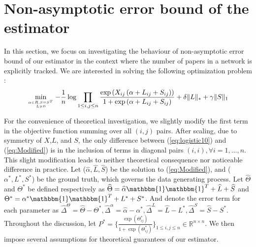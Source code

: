 \documentclass[AMS,STIX1COL]{WileyNJD-v2}
\begin{document}
{\section{Non-asymptotic error bound of the estimator}
\label{sec:theorem}
In this section, we focus on investigating the behaviour of non-asymptotic error bound of our estimator in the context where the number of papers in a network is explicitly tracked. We are interested in solving the following optimization problem :
\begin{equation}\label{eq:Modified}
\min\limits_{\alpha \in R, S = S^T \atop L \succcurlyeq 0}
-\frac{1}{n} \log \prod_{1\le i,j\le n}\frac{\exp\left(X_{ij}\left(\alpha+
L_{ij}+S_{ij}\right)\right)}{1+\exp\left(\alpha+
L_{ij}+S_{ij}\right)} + \delta \|L\|_\ast + \gamma \|S\|_1
\end{equation}

For the convenience of theoretical investigation, we slightly modify the first term in the objective function summing over all $(i,j)$ pairs.
After scaling, due to symmetry of $X$,$L$, and $S$, the only difference between (\ref{eq:logistic10}) and (\ref{eq:Modified}) is in the inclusion of terms in diagonal pairs $(i,i),\forall i=1,\dots,n$.
This slight modification leads to neither theoretical consequence nor noticeable difference in practice.
Let ($\widehat{\alpha},\widehat{L},\widehat{S}$) be the solution to (\ref{eq:Modified}), and ($\alpha^{*},L^{*},S^{*}$) be the ground truth, which governs the data generating process.
Let $\widehat{\Theta}$ and $\Theta^{*}$ be defined respectively as $\widehat{\Theta} = \widehat{\alpha}\mathbbm{1}\mathbbm{1}^T+\widehat{L}+\widehat{S}$ and $\Theta^{*} = \alpha^{*}\mathbbm{1}\mathbbm{1}^T+L^{*}+S^{*}$.
And denote the error term for each parameter as $\widehat{\Delta}^{\Theta} = \widehat{\Theta}-\Theta^{*},
\widehat{\Delta}^{\alpha} = \widehat{\alpha}-\alpha^{*},
\widehat{\Delta}^L = \widehat{L}-L^{*},
\widehat{\Delta}^S = \widehat{S}-S^{*}.$
Throughout the discussion, let $P^{*}=\bigg\{\frac{\exp(\Theta_{ij}^{*})}{1+\exp(\Theta_{ij}^{*})}\bigg\}_{1 \leq i,j \leq n} \in \mathbb{R}^{n \times n}$.
We then impose several assumptions for theoretical guarantees of our estimator.

}
\end{document}
